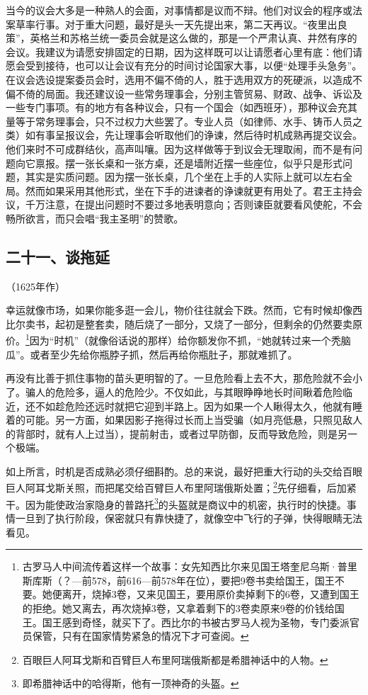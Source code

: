 \par 当今的议会大多是一种熟人的会面，对事情都是议而不辩。他们对议会的程序或法案草率行事。对于重大问题，最好是头一天先提出来，第二天再议。“夜里出良策”，英格兰和苏格兰统一委员会就是这么做的，那是一个严肃认真、井然有序的会议。我建议为请愿安排固定的日期，因为这样既可以让请愿者心里有底：他们请愿会受到接待，也可以让会议有充分的时间讨论国家大事，以便“处理手头急务”。在议会选设提案委员会时，选用不偏不倚的人，胜于选用双方的死硬派，以造成不偏不倚的局面。我还建议设一些常务理事会，分别主管贸易、财政、战争、诉讼及一些专门事项。有的地方有各种议会，只有一个国会（如西班牙），那种议会充其量等于常务理事会，只不过权力大些罢了。专业人员（如律师、水手、铸币人员之类）如有事呈报议会，先让理事会听取他们的诤谏，然后待时机成熟再提交议会。他们来时不可成群结伙，高声叫嚷。因为这样做等于到议会无理取闹，而不是有问题向它禀报。摆一张长桌和一张方桌，还是墙附近摆一些座位，似乎只是形式问题，其实是实质问题。因为摆一张长桌，几个坐在上手的人实际上就可以左右全局。然而如果采用其他形式，坐在下手的进谏者的诤谏就更有用处了。君王主持会议，千万注意，在提出问题时不要过多地表明意向；否则谏臣就要看风使舵，不会畅所欲言，而只会唱“我主圣明”的赞歌。




\subsection*{二十一、谈拖延}
\begin{center}
    （1625年作）
\end{center}
\par 幸运就像市场，如果你能多逛一会儿，物价往往就会下跌。然而，它有时候却像西比尔卖书，起初是整套卖，随后烧了一部分，又烧了一部分，但剩余的仍然要卖原价。\footnote{古罗马人中间流传着这样一个故事：女先知西比尔来见国王塔奎尼乌斯·普里斯库斯（？—前578，前616—前578年在位），要把9卷书卖给国王，国王不要。她便离开，烧掉3卷，又来见国王，要用原价卖掉剩下的6卷，又遭到国王的拒绝。她又离去，再次烧掉3卷，又拿着剩下的3卷卖原来9卷的价钱给国王。国王感到奇怪，就买下了。西比尔的书被古罗马人视为圣物，专门委派官员保管，只有在国家情势紧急的情况下才可查阅。}因为“时机”（就像俗话说的那样）给你额发你不抓，“她就转过来一个秃脑瓜”。或者至少先给你瓶脖子抓，然后再给你瓶肚子，那就难抓了。
\par 再没有比善于抓住事物的苗头更明智的了。一旦危险看上去不大，那危险就不会小了。骗人的危险多，逼人的危险少。不仅如此，与其眼睁睁地长时间瞅着危险临近，还不如趁危险还远时就把它迎到半路上。因为如果一个人瞅得太久，他就有睡着的可能。另一方面，如果因影子拖得过长而上当受骗（如月亮低悬，只照见敌人的背部时，就有人上过当），提前射击，或者过早防御，反而导致危险，则是另一个极端。
\par 如上所言，时机是否成熟必须仔细斟酌。总的来说，最好把重大行动的头交给百眼巨人阿耳戈斯关照，而把尾交给百臂巨人布里阿瑞俄斯处置；\footnote{百眼巨人阿耳戈斯和百臂巨人布里阿瑞俄斯都是希腊神话中的人物。}先仔细看，后加紧干。因为能使政治家隐身的普路托\footnote{即希腊神话中的哈得斯，他有一顶神奇的头盔。}的头盔就是商议中的机密，执行时的快捷。事情一旦到了执行阶段，保密就只有靠快捷了，就像空中飞行的子弹，快得眼睛无法看见。




